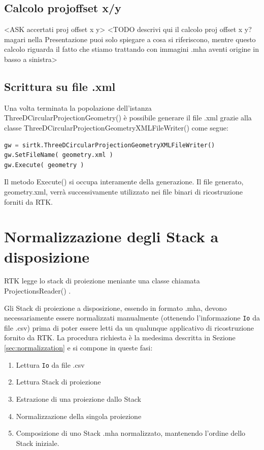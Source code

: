 \documentclass[a4paper,12pt, doubleside]{report}
\begin{document}
        
            \subsection{Calcolo proj\textunderscore offset \textunderscore x/y}
                <ASK accertati proj offset x y>
                <TODO descrivi qui il calcolo proj offset x y? magari nella Presentazione puoi solo spiegare a cosa si riferiscono, mentre questo calcolo riguarda il fatto che stiamo trattando con immagini .mha aventi origine in basso a sinistra>
                
            \subsection{Scrittura su file .xml}
                \par 
                    Una volta terminata la popolazione dell'istanza ThreeDCircularProjectionGeometry() è possibile generare il file .xml grazie alla classe ThreeDCircularProjectionGeometryXMLFileWriter() come segue:
                    \begin{lstlisting}[language=python, frame=bt]
gw = sirtk.ThreeDCircularProjectionGeometryXMLFileWriter()
gw.SetFileName( geometry.xml )
gw.Execute( geometry )
                    \end{lstlisting}
                    Il metodo Execute() si occupa interamente della generazione. Il file generato, geometry.xml, verrà successivamente utilizzato nei file binari di ricostruzione forniti da RTK.
        
        \section{Normalizzazione degli Stack a disposizione}
            \label{sec:norm-disp}
            \par
                RTK legge lo stack di proiezione meniante una classe chiamata ProjectionsReader() \cite{projections-reader}.
            \par    
                Gli Stack di proiezione a disposizione, essendo in formato .mha, devono necessariamente essere normalizzati manualmente (ottenendo l'informazione \texttt{Io} da file .csv) prima di poter essere letti da un qualunque applicativo di ricostruzione fornito da RTK.
                La procedura richiesta è la medesima descritta in Sezione \ref{sec:normalizzation} e si compone in queste fasi:
                \begin{enumerate}
                    \item Lettura \texttt{Io} da file .csv
                    \item Lettura Stack di proiezione
                    \item Estrazione di una proiezione dallo Stack
                    \item Normalizzazione della singola proiezione
                    \item Composizione di uno Stack .mha normalizzato, mantenendo l'ordine dello Stack iniziale.
                \end{enumerate}
                
\end{document}

